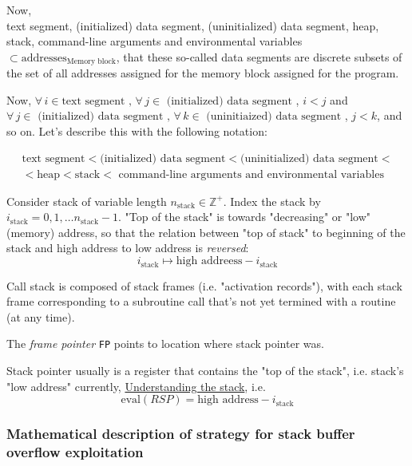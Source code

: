 \documentclass[10pt]{amsart}
\begin{document}
Now, \\
text segment, (initialized) data segment, (uninitialized) data segment, heap, stack, command-line arguments and environmental variables $\subset \text{addresses}_{\text{Memory block}}$, that these so-called data segments are discrete subsets of the set of all addresses assigned for the memory block assigned for the program.  

Now, $\forall \, i \in \text{text segment }, \, \forall \, j \in \text{ (initialized) data segment }$, $i<j$ and $\forall \, j \in \text{ (initialized) data segment }, \, \forall \, k \in \text{ (uninitiaized) data segment }$, $j<k$, and so on.  Let's describe this with the following notation:  

\begin{equation}
\begin{gathered}
\text{text segment} < \text{(initialized) data segment} < \text{(uninitialized) data segment} < \\
< \text{heap} < \text{stack} < \text{ command-line arguments and environmental variables}  
\end{gathered}
\end{equation}

Consider stack of variable length $n_{\text{stack}} \in \mathbb{Z}^+$.  Index the stack by $i_{\text{stack}} = 0,1,\dots n_{\text{stack}} - 1$.  "Top of the stack" is towards "decreasing" or "low" (memory) address, so that the relation between "top of stack" to beginning of the stack and high address to low address is \emph{reversed}: 
\[
i_{\text{stack}} \mapsto \text{high addreess} - i_{\text{stack}}
\]

Call stack is composed of stack frames (i.e. "activation records"), with each stack frame corresponding to a subroutine call that's not yet termined with a routine (at any time).  

The \emph{frame pointer} \verb|FP| points to location where stack pointer was.  

Stack pointer usually is a register that contains the "top of the stack", i.e. stack's "low address" currently,  \href{https://www.cs.umd.edu/class/sum2003/cmsc311/Notes/Mips/stack.html}{Understanding the stack}, i.e. 
\begin{equation}
\text{eval}(RSP) = \text{high address} - i_{\text{stack}}
\end{equation}



\subsubsection{Mathematical description of strategy for stack buffer overflow exploitation}
\end{document}
